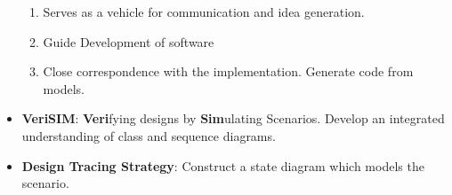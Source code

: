 \documentclass[a4paper]{article}
\begin{document}
\begin{itemize}
    \begin{enumerate}
        \item Serves as a vehicle for communication and idea generation.
        \item Guide Development of software
        \item Close correspondence with the implementation. Generate code from models.
    \end{enumerate}
    \item \textbf{VeriSIM}: \textbf{Veri}fying designs by \textbf{Sim}ulating Scenarios. Develop an integrated understanding of class and sequence diagrams.
    \item \textbf{Design Tracing Strategy}: Construct a state diagram which models the scenario.
\end{itemize}
\end{document}
